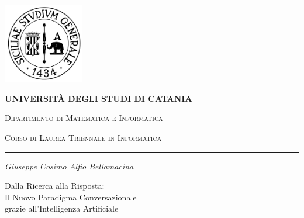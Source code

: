 \begin{titlepage}
\centering 

\includegraphics[width=3.5cm,height=3.5cm]{Images/svg_logo.pdf}

\bigskip

\bigskip

\bigskip %

{\Large \textbf{UNIVERSIT\`A DEGLI STUDI DI CATANIA}}

{\scshape
\large
Dipartimento di Matematica e Informatica
}

{\scshape
\normalsize
Corso di Laurea Triennale in Informatica
}

\bigskip %

\hrule %

\bigskip

\bigskip

\bigskip

\bigskip

\bigskip %

{\itshape
\large
Giuseppe Cosimo Alfio Bellamacina
\par}

\bigskip

\bigskip

\bigskip

\bigskip

\bigskip %

{\centering
\Large
Dalla Ricerca alla Risposta: \\
Il Nuovo Paradigma Conversazionale \\
grazie all'Intelligenza Artificiale
\par}

\bigskip

\bigskip

\bigskip

\bigskip

\bigskip

\bigskip %


\end{titlepage}
